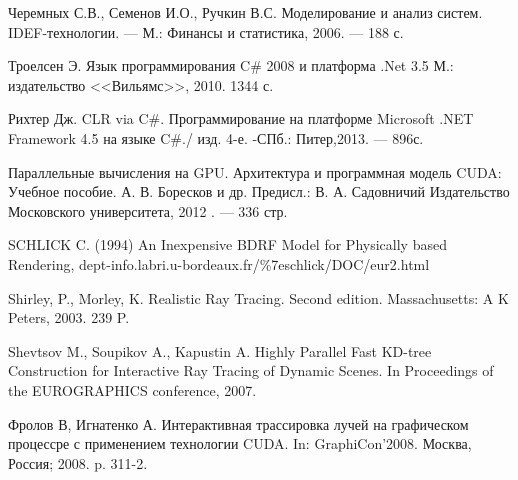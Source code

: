 
\begin{thebibliography}{99}


 {Черемных С.В., Семенов И.О., Ручкин В.С. Моделирование и анализ систем. IDEF-технологии. — М.: Финансы и статистика, 2006. — 188 с.}

 {Троелсен Э. Язык программирования C\# 2008  и платформа .Net 3.5  М.: издательство <<Вильямс>>, 2010. 1344 с.}

 {Рихтер Дж. CLR via C\#. Программирование на платформе Microsoft .NET Framework 4.5 на языке C\#./ изд. 4-е. -СПб.: Питер,2013. — 896с.}

 {Параллельные вычисления на GPU. Архитектура и программная модель CUDA: Учебное пособие. А. В. Боресков и др. Предисл.: В. А. Садовничий Издательство Московского университета, 2012 . — 336 стр.}

 { SCHLICK C. (1994) An Inexpensive BDRF Model for Physically based Rendering, dept-info.labri.u-bordeaux.fr/\%7eschlick/DOC/eur2.html}

 {Shirley, P., Morley, K. Realistic Ray Tracing. Second edition. Massachusetts: A K Peters, 2003. 239 P.}

 {Shevtsov M., Soupikov A., Kapustin A. Highly Parallel Fast KD-tree Construction for Interactive Ray Tracing of Dynamic Scenes. In Proceedings of the EUROGRAPHICS conference, 2007.}

 {Фролов В, Игнатенко А. Интерактивная трассировка лучей на графическом процессре с применением технологии CUDA. In: GraphiCon'2008. Москва, Россия; 2008. p. 311-2.}

\end{thebibliography}
